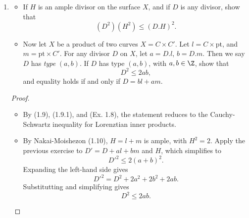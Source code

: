 \documentclass[a4paper]{article}
\begin{document}
\begin{enumerate} [label=\textbf{\arabic*.}, leftmargin=0em]
    \item \begin{itemize}
              \item[(a)] If $H$ is an ample divisor on the surface $X$, and if $D$ is any divisor, show that
                    \begin{equation*}
                        (D^2)(H^2) \leq (D.H)^2.
                    \end{equation*}
              \item[(b)] Now let $X$ be a product of two curves $X = C \times C'$.
                    Let $l = C \times \text{pt}$, and $m = \text{pt} \times C'$.
                    For any divisor $D$ on $X$, let $a = D.l$, $b = D.m$.
                    Then we say $D$ has \textit{type} $(a, b)$.
                    If $D$ has type $(a, b)$, with $a, b \in \Z$, show that
                    \begin{equation*}
                        D^2 \leq 2ab,
                    \end{equation*}
                    and equality holds if and only if $D = bl + am$.
          \end{itemize}

          \begin{proof} $ $ \vspace{0pt}
              \begin{itemize} [leftmargin=0cm]
                  \item[(a)] By (1.9), (1.9.1), and (Ex. 1.8), the statement reduces to the Cauchy-Schwartz inequality for Lorenztian inner products.

                  \item[(b)] By Nakai-Moishezon (1.10), $H = l + m$ is ample, with $H^2 = 2$.
                        Apply the previous exercise to $D' = D + al + bm$ and $H$, which simplifies to
                        \begin{equation*}
                            D'^2 \leq 2(a + b)^2.
                        \end{equation*}
                        Expanding the left-hand side gives
                        \begin{equation*}
                            D'^2 = D^2 + 2a^2 + 2b^2 + 2ab.
                        \end{equation*}
                        Substitutting and simplifying gives
                        \begin{equation*}
                            D^2 \leq 2ab.
                        \end{equation*}
              \end{itemize}
          \end{proof}


\end{enumerate}
\end{document}
